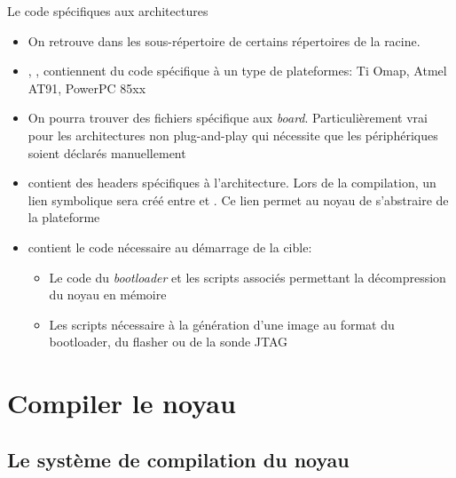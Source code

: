 \begin{frame}[fragile=singleslide]{Le code spécifiques aux architectures}
  \begin{itemize} 
  \item On retrouve dans  les sous-répertoire de  certains
    répertoires de la racine.
  \item  {}, ,   contiennent du
    code spécifique  à un  type de plateformes:  Ti Omap,  Atmel AT91,
    PowerPC 85xx
  \item    On   pourra   trouver    des   fichiers    spécifique   aux
    \emph{board}.  Particulièrement vrai  pour  les architectures  non
    plug-and-play qui nécessite  que les périphériques soient déclarés
    manuellement
  \item   {}   contient   des   headers   spécifiques   à
    l'architecture. Lors  de la  compilation, un lien  symbolique sera
    créé         entre                et
    . Ce  lien permet au noyau de  s'abstraire de la
    plateforme
  \item {}  contient le code  nécessaire au démarrage  de la
    cible:
    \begin{itemize}
    \item  Le  code  du  \emph{bootloader}  et  les  scripts  associés
      permettant la décompression du noyau en mémoire
    \item Les scripts nécessaire à la génération d'une image au format
      du bootloader, du flasher ou de la sonde JTAG
    \end{itemize} 
  \end{itemize} 
\end{frame} 

\section{Compiler le noyau}

\subsection{Le système de compilation du noyau}

